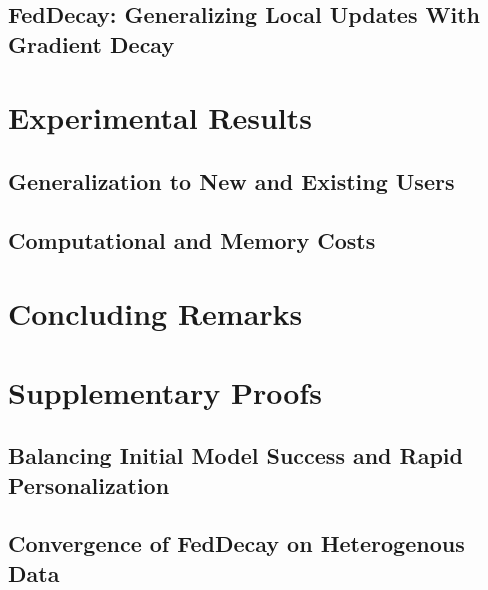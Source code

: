 \documentclass[10pt]{article}
\begin{document}
        \subsection{FedDecay: Generalizing Local Updates With Gradient Decay} 
        \label{sec: decay-method-decay}
        

    \section{Experimental Results}
    \label{sec: decay-exp}
    

        \subsection{Generalization to New and Existing Users}
        \label{sec: decay-exp-gen}
        

        \subsection{Computational and Memory Costs}
        \label{sec: decay-exp-costs}
        

    \section{Concluding Remarks}
    \label{decay-conclusion}
    


    
    

    \clearpage
    \appendix

    \section{Supplementary Proofs}

        \subsection{Balancing Initial Model Success and Rapid Personalization}
        \label{pf: decay-pf-taylor}
        

        \subsection{Convergence of FedDecay on Heterogenous Data}
        \label{pf: decay-pf-conv}
        
\end{document}
